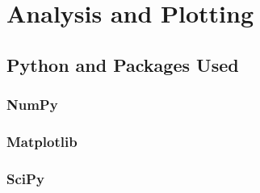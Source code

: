 
%
%

\section{Analysis and Plotting}
\label{sec:analysis}





\subsection{Python and Packages Used}
\label{subsec:analysis--python}



\subsubsection{NumPy}
\label{subsubsec:analysis--python--numpy}



\subsubsection{Matplotlib}
\label{subsubsec:analysis--python--matplotlib}



\subsubsection{SciPy}
\label{subsubsec:analysis--python--scipy}



